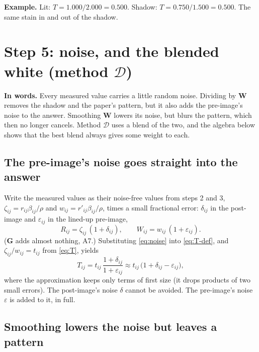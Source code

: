 \documentclass[11pt,letter]{article}
\newcommand{\iG}{\mathbf{G}}   %
\newcommand{\iW}{\mathbf{W}}   %
\newcommand{\MD}{\mathcal{D}}
\begin{document}
\textbf{Example.}  Lit: $T = 1.000 / 2.000 = 0.500$.  Shadow:
$T = 0.750 / 1.500 = 0.500$.  The same stain in and out of the shadow.

\section{Step 5: noise, and the blended white (method \texorpdfstring{$\MD$}{D})}
\label{sec:noise}

\textbf{In words.}  Every measured value carries a little random noise.
Dividing by $\iW$ removes the shadow and the paper's pattern, but it also
adds the pre-image's noise to the answer.  Smoothing $\iW$ lowers its noise,
but blurs the pattern, which then no longer cancels.  Method $\MD$ uses a
blend of the two, and the algebra below shows that the best blend always
gives some weight to each.

\subsection{The pre-image's noise goes straight into the answer}

Write the measured values as their noise-free values from steps 2 and 3,
$\zeta_{ij} = r_{ij} \beta_{ij}/\rho$ and $w_{ij} = r'_{ij} \beta_{ij}/\rho$, times a
small fractional error: $\delta_{ij}$ in the post-image and
$\varepsilon_{ij}$ in the lined-up pre-image,
\begin{equation}
  R_{ij} = \zeta_{ij}\,(1 + \delta_{ij}), \qquad
  W_{ij} = w_{ij}\,(1 + \varepsilon_{ij}) .
  \label{eq:noise}
\end{equation}
($\iG$ adds almost nothing, A7.)  Substituting \eqref{eq:noise} into
\eqref{eq:T-def}, and $\zeta_{ij}/w_{ij} = t_{ij}$ from \eqref{eq:T}, yields
\begin{equation}
  T_{ij} = t_{ij}\, \frac{1 + \delta_{ij}}{1 + \varepsilon_{ij}}
         \approx t_{ij}\,\bigl(1 + \delta_{ij} - \varepsilon_{ij}\bigr),
  \label{eq:T-noise}
\end{equation}
where the approximation keeps only terms of first size (it drops products
of two small errors).  The post-image's noise $\delta$ cannot be avoided.
The pre-image's noise $\varepsilon$ is added to it, in full.

\subsection{Smoothing lowers the noise but leaves a pattern}
\end{document}
